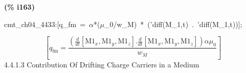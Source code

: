 \documentclass[fleqn]{article}
\begin{document}
\noindent
\begin{minipage}[t]{4.000000em}\color{red}\bfseries
(\% i163)	
\end{minipage}
\begin{minipage}[t]{\textwidth}\color{blue}
cmt\_ch04\_4433:[q\_fm\ =\ \ensuremath{\alpha}*(\ensuremath{\mu}\_0/w\_M)\ *\ ('diff(M\_1,t)\ .\ 'diff(M\_1,t))];
\end{minipage}
\[\displaystyle \tag{\% o163} 
\left[ {q_{\ensuremath{\mathrm{fm}}}}=\frac{\left( \frac{d}{d t} \left[ {{\ensuremath{\mathrm{M1}}}_x}\operatorname{,}{{\ensuremath{\mathrm{M1}}}_y}\operatorname{,}{{\ensuremath{\mathrm{M1}}}_z}\right] \ensuremath{\mathrm{ . }}\frac{d}{d t} \left[ {{\ensuremath{\mathrm{M1}}}_x}\operatorname{,}{{\ensuremath{\mathrm{M1}}}_y}\operatorname{,}{{\ensuremath{\mathrm{M1}}}_z}\right] \right)  \alpha  {{\mu }_0}}{{w_M}}\right] \mbox{}
\]
4.4.1.3 Contribution Of Drifting Charge Carriers in a Medium
\end{document}
